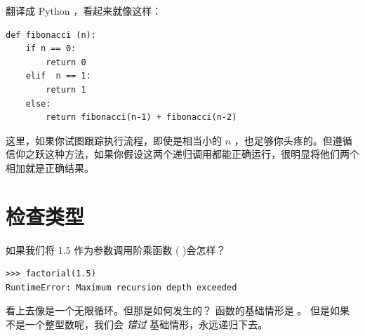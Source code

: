 %

翻译成 Python ，看起来就像这样：

\begin{lstlisting}
def fibonacci (n):
    if n == 0:
        return 0
    elif  n == 1:
        return 1
    else:
        return fibonacci(n-1) + fibonacci(n-2)
\end{lstlisting}

%

这里，如果你试图跟踪执行流程，即使是相当小的 $n$ ，也足够你头疼的。但遵循信仰之跃这种方法，如果你假设这两个递归调用都能正确运行，很明显将他们两个相加就是正确结果。



\section{检查类型}
\label{guardian}


如果我们将 1.5 作为参数调用阶乘函数 (  )会怎样？

  
  

\begin{lstlisting}
>>> factorial(1.5)
RuntimeError: Maximum recursion depth exceeded
\end{lstlisting}

%

看上去像是一个无限循环。但那是如何发生的？ 函数的基础情形是  。
但是如果  不是一个整型数呢，我们会 {\em 错过} 基础情形，永远递归下去。
  


